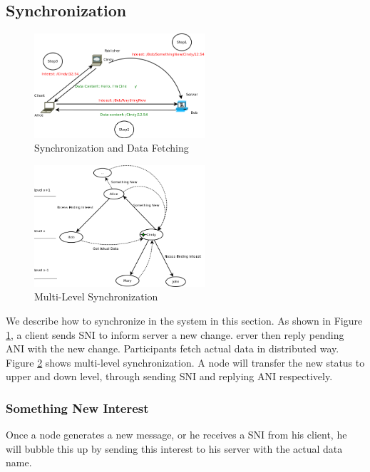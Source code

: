 \documentclass[conference]{IEEEtran}
\begin{document}
\subsection{Synchronization}
\begin{figure}[!t]
\centering
\includegraphics[width=2.5in]{../png/synchronization.png}
\caption{Synchronization and Data Fetching}
\label{synchronization}
\end{figure}
\begin{figure}[!t]
\centering
\includegraphics[width=2.5in]{../png/tree-synchronization.png}
\caption{Multi-Level Synchronization}
\label{tree_synchronization}
\end{figure}
We describe how to synchronize in the system in this section.
As shown in Figure \ref{synchronization}, a client sends SNI to inform server a new change.
erver then reply pending ANI with the new change.
Participants fetch actual data in distributed way.
Figure \ref{tree_synchronization} shows multi-level synchronization.
A node will transfer the new status to upper and down level,
through sending SNI and replying ANI respectively.

\subsubsection{Something New Interest}
Once a node generates a new message, or he receives a SNI from his client,
he will bubble this up by sending this interest to his server with the actual data name.
\end{document}
